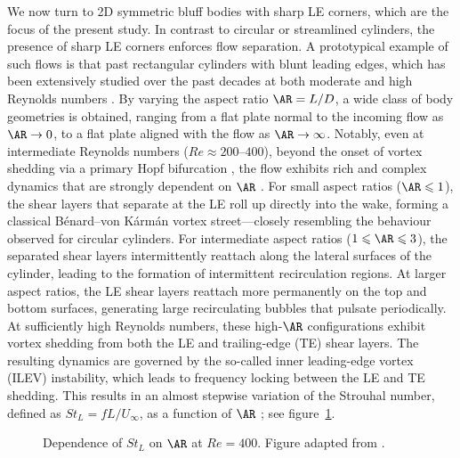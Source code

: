 We now turn to 2D symmetric bluff bodies with sharp LE corners, which are the focus of the present study. In contrast to circular or streamlined cylinders, the presence of sharp LE corners enforces flow separation. A prototypical example of such flows is that past rectangular cylinders with blunt leading edges, which has been extensively studied over the past decades at both moderate \citep{hourigan-thompson-tan-2001,zhang-etal-2023} and high Reynolds numbers \citep{cimarelli-leonforte-angeli-2018,chiarini-quadrio-2021,chiarini-etal-2022,cimarelli-etal-2024}. By varying the aspect ratio $\AR = L/D$, a wide class of body geometries is obtained, ranging from a flat plate normal to the incoming flow as $\AR \to 0$, to a flat plate aligned with the flow as $\AR \to \infty$.
%
Notably, even at intermediate Reynolds numbers ($Re \approx 200$–$400$), beyond the onset of vortex shedding via a primary Hopf bifurcation \citep{chiarini-quadrio-auteri-2021}, the flow exhibits rich and complex dynamics that are strongly dependent on $\AR$ \citep[see, e.g.][]{okajima-1982,nakamura-etal-1991,mills-etal-1995}. For small aspect ratios ($\AR \leq 1$), the shear layers that separate at the LE roll up directly into the wake, forming a classical Bénard--von Kármán vortex street---closely resembling the behaviour observed for circular cylinders. For intermediate aspect ratios ($1 \leq \AR \leq 3$), the separated shear layers intermittently reattach along the lateral surfaces of the cylinder, leading to the formation of intermittent recirculation regions. At larger aspect ratios, the LE shear layers reattach more permanently on the top and bottom surfaces, generating large recirculating bubbles that pulsate periodically.
%
At sufficiently high Reynolds numbers, these high-$\AR$ configurations exhibit vortex shedding from both the LE and trailing-edge (TE) shear layers. The resulting dynamics are governed by the so-called inner leading-edge vortex (ILEV) instability, which leads to frequency locking between the LE and TE shedding. This results in an almost stepwise variation of the Strouhal number, defined as $St_L = fL/U_\infty$, as a function of $\AR$ \citep{okajima-1982,nakamura-etal-1991,hourigan-thompson-tan-2001}; see figure~\ref{fig:StLAR}.
%
\begin{figure}
  \centering
   
   \caption{Dependence of $St_L$ on $\AR$ at $Re=400$. Figure adapted from \cite{chiarini-quadrio-auteri-2022}.}
   \label{fig:StLAR}
\end{figure}
%
